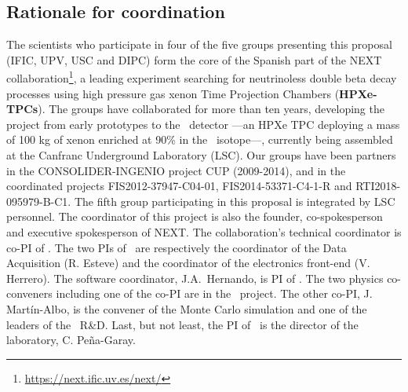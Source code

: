 \subsection{Rationale for coordination}
 The scientists who participate in four of the five groups presenting this proposal (IFIC, UPV, USC and DIPC) form the core of the Spanish part of the NEXT collaboration\footnote{\url{https://next.ific.uv.es/next/}}, a leading experiment searching for neutrinoless double beta decay processes using high pressure gas xenon Time Projection Chambers ({\bf HPXe-TPCs}). The groups have collaborated for more than ten years, developing the project from early prototypes to the \Next\ detector ---an HPXe TPC deploying a mass of 100 kg of xenon enriched at 90\% in the \XE\ isotope---, currently being assembled at the Canfranc Underground Laboratory (LSC).  Our groups have been partners in the CONSOLIDER-INGENIO project CUP (2009-2014), and in the coordinated projects FIS2012-37947-C04-01, FIS2014-53371-C4-1-R and RTI2018-095979-B-C1. The fifth group participating in this proposal is integrated by LSC personnel. The coordinator of this project is also the founder, co-spokesperson and executive spokesperson of NEXT.  The collaboration's technical coordinator is co-PI of \sDIPC. The two PIs of \sUPV\ are respectively the coordinator of the Data Acquisition (R. Esteve)  and the coordinator of the electronics front-end (V. Herrero). The software coordinator, J.A.~Hernando, is PI of \sUSC.  The two physics co-conveners including one of the co-PI are in the \sIFIC\ project. The other co-PI, J. Martín-Albo, is the convener of the Monte Carlo simulation and one of the leaders of the \NHD\ R\&D. Last, but not least, the PI of \sLSC\ is the director of the laboratory, C. Pe\~na-Garay.  

  
% 
 
